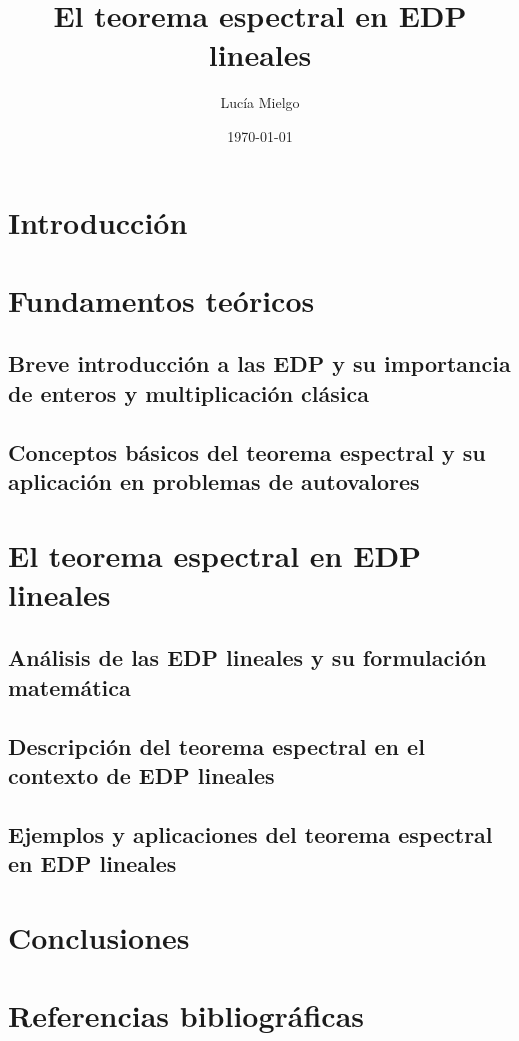 \documentclass{article}
\title{El teorema espectral en EDP lineales}
\author{Lucía Mielgo}
\date{\today}
\begin{document}
\maketitle

\newpage
\tableofcontents

\section{Introducción}
    
\section{Fundamentos teóricos}
    \subsection{Breve introducción a las EDP y su importancia de enteros y multiplicación clásica}
    \subsection{Conceptos básicos del teorema espectral y su aplicación en problemas de autovalores}
    
\section{El teorema espectral en EDP lineales}
    \subsection{Análisis de las EDP lineales y su formulación matemática}
    \subsection{Descripción del teorema espectral en el contexto de EDP lineales}
    \subsection{Ejemplos y aplicaciones del teorema espectral en EDP lineales}
    
\section{Conclusiones}
\section{Referencias bibliográficas}
\end{document}
